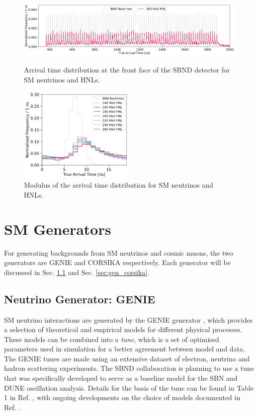 \begin{figure}[ht!] 
\centering    
\includegraphics[width=1.0\textwidth]{full_beam}
\caption[Arrival Time of SM Neutrinos and HNLs at the Front Face of SBND]{
Arrival time distribution at the front face of the SBND detector for SM neutrinos and HNLs. 
}
\label{fig:full_beam}
\vspace{0.5cm}
\centering    
\includegraphics[width=0.495\textwidth]{beam_modulus}
\caption[Modulus of the Arrival Time Distibutions of SM Neutrinos and HNLs]{
Modulus of the arrival time distribution for SM neutrinos and HNLs. 
}
\label{fig:beam_modulus}
\end{figure}

\newpage
\section{SM Generators}
\label{sec:gen_sm}

For generating backgrounds from SM neutrinos and cosmic muons, the two generators are GENIE \cite{genie} and CORSIKA \cite{corsika} respectively.
Each generator will be discussed in Sec. \ref{sec:gen_genie} and Sec. \ref{sec:gen_corsika}.

\subsection{Neutrino Generator: GENIE}
\label{sec:gen_genie}

SM neutrino interactions are generated by the GENIE generator \cite{genie}, which provides a selection of theoretical and empirical models for different physical processes.
These models can be combined into a \textit{tune}, which is a set of optimised parameters used in simulation for a better agreement between model and data.
The GENIE tunes are made using an extensive dataset of electron, neutrino and hadron scattering experiments.
The SBND collaboration is planning to use a tune that was specifically developed to serve as a baseline model for the SBN and DUNE oscillation analysis.
Details for the basis of the tune can be found in Table 1 in Ref. \cite{genie_tune}, with ongoing developments on the choice of models documented in Ref. \cite{genie_tune_github}.  

